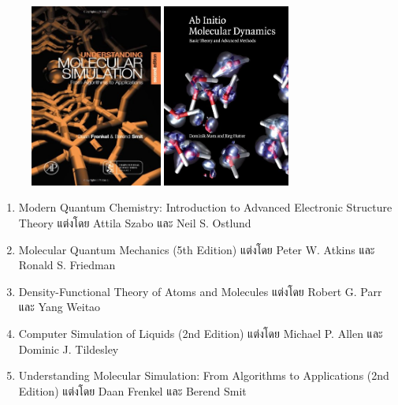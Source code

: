 {\begin{figure}[H]
\begin{center}
        \hspace{0.5em}
        \includegraphics[height=6cm]{fig/understand-mol-sim.jpg}
        \hspace{0.5em}
        \includegraphics[height=6cm]{fig/aimd.jpeg}
    \end{center}
\end{figure}

\begin{enumerate}[topsep=0pt,noitemsep]
    \setlength\itemsep{1em}
    \item Modern Quantum Chemistry: Introduction to Advanced Electronic Structure Theory
    แต่งโดย Attila Szabo และ Neil S. Ostlund\autocite{szabo1996}

    \item Molecular Quantum Mechanics (5th Edition)
    แต่งโดย Peter W. Atkins และ Ronald S. Friedman\autocite{atkins2010}

    \item Density-Functional Theory of Atoms and Molecules 
    แต่งโดย Robert G. Parr และ Yang Weitao\autocite{parr1994}

    \item Computer Simulation of Liquids (2nd Edition)
    แต่งโดย Michael P. Allen และ Dominic J. Tildesley\autocite{allen2017}
    
    \item Understanding Molecular Simulation: From Algorithms to Applications (2nd Edition)
    แต่งโดย Daan Frenkel และ Berend Smit\autocite{frenkel2001}


\end{enumerate}}
